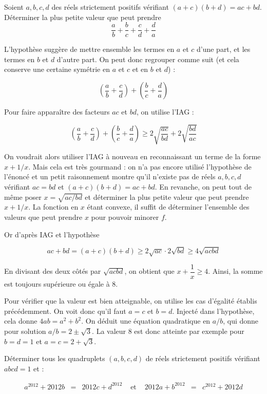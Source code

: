 \begin{exo}[IMO SL 2020 A3]
Soient $a,b,c,d$ des réels strictement positifs vérifiant $(a+c)(b+d)=ac+bd$. Déterminer la plus petite valeur que peut prendre
$$\frac{a}{b}+\frac{b}{c}+\frac{c}{d}+\frac{d}{a}$$
\end{exo}

\begin{sol}
L'hypothèse suggère de mettre ensemble les termes en $a$ et $c$ d'une part, et les termes en $b$ et $d$ d'autre part. On peut donc regrouper comme suit (et cela conserve une certaine symétrie en $a$ et $c$ et en $b$ et $d$) :

$$\left(\frac{a}{b} +\frac{c}{d}\right) + \left(\frac{b}{c}+\frac{d}{a}\right)$$

Pour faire apparaître des facteurs $ac$ et $bd$, on utilise l'IAG :

$$\left(\frac{a}{b} +\frac{c}{d}\right) + \left(\frac{b}{c}+\frac{d}{a}\right) \ge 2\sqrt{\frac{ac}{bd}}+ 2 \sqrt{\frac{bd}{ac}}$$

On voudrait alors utiliser l'IAG à nouveau en reconnaissant un terme de la forme $x+1/x$. Mais cela est très gourmand : on n'a pas encore utilisé l'hypothèse de l'énoncé et un petit raisonnement montre qu'il n'existe pas de réels $a,b,c,d$ vérifiant $ac=bd$ et $(a+c)(b+d)=ac+bd$. En revanche, on peut tout de même poser $x=\sqrt{ac/bd}$ et déterminer la plus petite valeur que peut prendre $x+1/x$. La fonction en $x$ étant convexe, il suffit de déterminer l'ensemble des valeurs que peut prendre $x$ pour pouvoir minorer $f$.

\medskip

Or d'après IAG et l'hypothèse

$$ac+bd= (a+c)(b+d) \ge 2\sqrt{ac}\cdot 2 \sqrt{bd} \ge 4 \sqrt{acbd}$$

En divisant des deux côtés par $\sqrt{acbd}$, on obtient que $x+\dfrac1{x} \ge 4$. Ainsi, la somme est toujours supérieure ou égale à $8$.

\medskip

Pour vérifier que la valeur est bien atteignable, on utilise les cas d'égalité établis précédemment. On voit donc qu'il faut $a=c$ et $b=d$. Injecté dans l'hypothèse, cela donne $4ab=a^2+b^2$. On déduit une équation quadratique en $a/b$, qui donne pour solution $a/b= 2\pm \sqrt{3}$. La valeur $8$ est donc atteinte par exemple pour $b=d=1$ et $a=c=2+\sqrt{3}$.
\end{sol}


\begin{exo}[BXMO 2012]
Déterminer tous les quadruplets $(a,b,c,d)$ de réels strictement positifs vérifiant $abcd=1$ et :

$$\begin{array}{lllllll}
a^{2012}+2012b &=& 2012c+d^{2012} &\text{ et } & 2012a+b^{2012} &=& c^{2012}+2012d\\
\end{array}$$
\end{exo}

